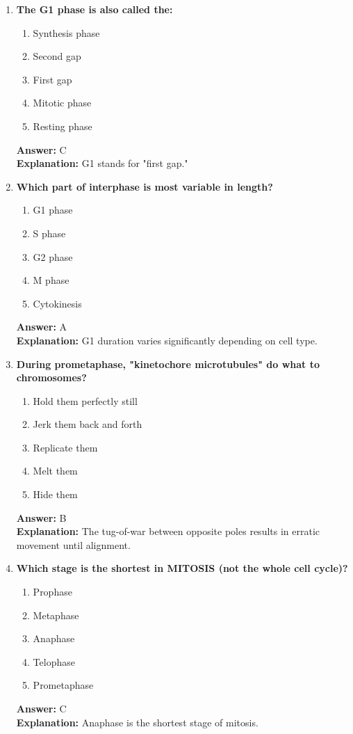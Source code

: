 \documentclass[11pt, a4paper]{article}
\begin{document}
\begin{enumerate}[leftmargin=*, label=\arabic*.]
\item \textbf{The G1 phase is also called the:}
\begin{enumerate}[label=\Alph*.]
\item Synthesis phase
\item Second gap
\item First gap
\item Mitotic phase
\item Resting phase
\end{enumerate}
\textbf{Answer:} C \\
\textbf{Explanation:} G1 stands for "first gap."

\item \textbf{Which part of interphase is most variable in length?}
\begin{enumerate}[label=\Alph*.]
\item G1 phase
\item S phase
\item G2 phase
\item M phase
\item Cytokinesis
\end{enumerate}
\textbf{Answer:} A \\
\textbf{Explanation:} G1 duration varies significantly depending on cell type.

\item \textbf{During prometaphase, "kinetochore microtubules" do what to chromosomes?}
\begin{enumerate}[label=\Alph*.]
\item Hold them perfectly still
\item Jerk them back and forth
\item Replicate them
\item Melt them
\item Hide them
\end{enumerate}
\textbf{Answer:} B \\
\textbf{Explanation:} The tug-of-war between opposite poles results in erratic movement until alignment.

\item \textbf{Which stage is the shortest in MITOSIS (not the whole cell cycle)?}
\begin{enumerate}[label=\Alph*.]
\item Prophase
\item Metaphase
\item Anaphase
\item Telophase
\item Prometaphase
\end{enumerate}
\textbf{Answer:} C \\
\textbf{Explanation:} Anaphase is the shortest stage of mitosis.


\end{enumerate}
\end{document}
